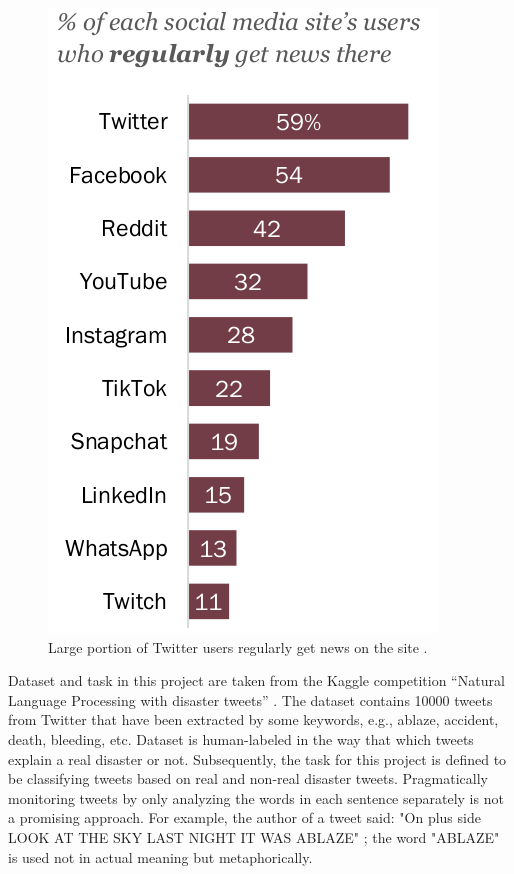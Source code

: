 \documentclass[sigconf]{acmart}
\begin{document}
\begin{figure}[h]
  \centering
  \includegraphics[scale=0.35]{twitter.png}
  \caption{Large portion of Twitter users regularly get news on the site \cite{shearer2021news}.}
  \label{fig:twitter}
\end{figure}

Dataset and task in this project are taken from the Kaggle competition “Natural Language Processing with disaster tweets” \cite{kagglecomp}. The dataset contains 10000 tweets from Twitter that have been extracted by some keywords, e.g., ablaze, accident, death, bleeding, etc. Dataset is human-labeled in the way that which tweets explain a real disaster or not. Subsequently, the task for this project is defined to be classifying tweets based on real and non-real disaster tweets. Pragmatically monitoring tweets by only analyzing the words in each sentence separately is not a promising approach. For example, the author of a tweet said: "On plus side LOOK AT THE SKY LAST NIGHT IT WAS ABLAZE" \cite{tw}; the word "ABLAZE" is used not in actual meaning but metaphorically.
\end{document}
